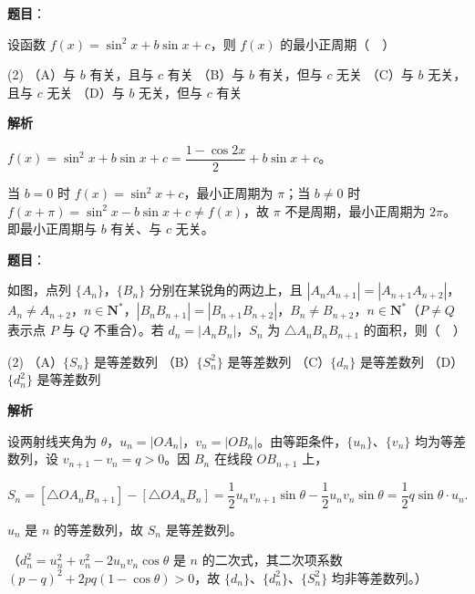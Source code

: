 \begin{answer}

\textbf{题目}：

设函数 \(f(x)=\sin^{2}x+b\sin x+c\)，则 \(f(x)\) 的最小正周期（　）

\begin{gkopts}(2)
\task （A）与 \(b\) 有关，且与 \(c\) 有关
\task （B）与 \(b\) 有关，但与 \(c\) 无关
\task （C）与 \(b\) 无关，且与 \(c\) 无关
\task （D）与 \(b\) 无关，但与 \(c\) 有关
\end{gkopts}

\textbf{解析}

\(f(x)=\sin^{2}x+b\sin x+c=\dfrac{1-\cos 2x}{2}+b\sin x+c\)。

当 \(b=0\) 时 \(f(x)=\sin^{2}x+c\)，最小正周期为 \(\pi\)；当 \(b\neq 0\) 时 \(f(x+\pi)=\sin^{2}x-b\sin x+c\neq f(x)\)，故 \(\pi\) 不是周期，最小正周期为 \(2\pi\)。即最小正周期与 \(b\) 有关、与 \(c\) 无关。


\end{answer}
\begin{answer}

\textbf{题目}：

如图，点列 \(\{A_{n}\}\)，\(\{B_{n}\}\) 分别在某锐角的两边上，且 \(|A_{n}A_{n+1}|=|A_{n+1}A_{n+2}|\)，\(A_{n}\neq A_{n+2}\)，\(n\in\mathbf{N}^{*}\)，\(|B_{n}B_{n+1}|=|B_{n+1}B_{n+2}|\)，\(B_{n}\neq B_{n+2}\)，\(n\in\mathbf{N}^{*}\)（\(P\neq Q\) 表示点 \(P\) 与 \(Q\) 不重合）。若 \(d_{n}=|A_{n}B_{n}|\)，\(S_{n}\) 为 \(\triangle A_{n}B_{n}B_{n+1}\) 的面积，则（　）
\nopagebreak[4]
\begin{center}\end{center}
\nopagebreak[4]
\begin{gkopts}(2)
\task （A）\(\{S_{n}\}\) 是等差数列
\task （B）\(\{S_{n}^{2}\}\) 是等差数列
\task （C）\(\{d_{n}\}\) 是等差数列
\task （D）\(\{d_{n}^{2}\}\) 是等差数列
\end{gkopts}

\textbf{解析}

设两射线夹角为 \(\theta\)，\(u_{n}=|OA_{n}|\)，\(v_{n}=|OB_{n}|\)。由等距条件，\(\{u_{n}\}\)、\(\{v_{n}\}\) 均为等差数列，设 \(v_{n+1}-v_{n}=q>0\)。因 \(B_{n}\) 在线段 \(OB_{n+1}\) 上，

\nopagebreak[4]
\[
S_{n}=[\triangle OA_{n}B_{n+1}]-[\triangle OA_{n}B_{n}]=\dfrac{1}{2}u_{n}v_{n+1}\sin\theta-\dfrac{1}{2}u_{n}v_{n}\sin\theta=\dfrac{1}{2}q\sin\theta\cdot u_{n}.
\]

\(u_{n}\) 是 \(n\) 的等差数列，故 \(S_{n}\) 是等差数列。

（\(d_{n}^{2}=u_{n}^{2}+v_{n}^{2}-2u_{n}v_{n}\cos\theta\) 是 \(n\) 的二次式，其二次项系数 \((p-q)^{2}+2pq(1-\cos\theta)>0\)，故 \(\{d_{n}\}\)、\(\{d_{n}^{2}\}\)、\(\{S_{n}^{2}\}\) 均非等差数列。）


\end{answer}
